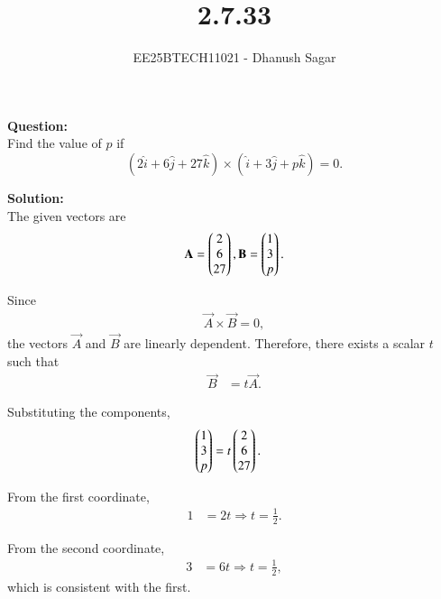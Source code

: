 \documentclass[journal]{IEEEtran}
\begin{document}



\title{2.7.33}
\author{EE25BTECH11021 - Dhanush Sagar
}
{\let\newpage\relax\maketitle}

\renewcommand{\thefigure}{\theenumi}
\renewcommand{\thetable}{\theenumi}
\setlength{\intextsep}{10pt} %


\renewcommand{\thetable}{\theenumi}


\textbf{Question:} \\
Find the value of $p$ if
\[
(2\hat{i} + 6\hat{j} + 27\hat{k}) \times (\hat{i} + 3\hat{j} + p\hat{k}) = 0.
\]

\textbf{Solution:} \\
The given vectors are
\begin{align}
\mathbf{A} = \begin{pmatrix}2 \\ 6 \\ 27\end{pmatrix}, 
\mathbf{B} = \begin{pmatrix}1 \\ 3 \\ p\end{pmatrix}.
\end{align}

Since
\begin{align}
\vec{A} \times \vec{B} = 0,
\end{align}
the vectors $\vec{A}$ and $\vec{B}$ are linearly dependent. Therefore, there exists a scalar $t$ such that
\begin{align}
\vec{B} &= t \vec{A}.
\end{align}

Substituting the components,
\begin{align}
\begin{pmatrix}1 \\ 3 \\ p\end{pmatrix} &= t \begin{pmatrix}2 \\ 6 \\ 27\end{pmatrix}.
\end{align}

From the first coordinate,
\begin{align}
1 &= 2t  \Rightarrow  t = \tfrac{1}{2}.
\end{align}

From the second coordinate,
\begin{align}
3 &= 6t  \Rightarrow  t = \tfrac{1}{2},
\end{align}
which is consistent with the first.
\end{document}

